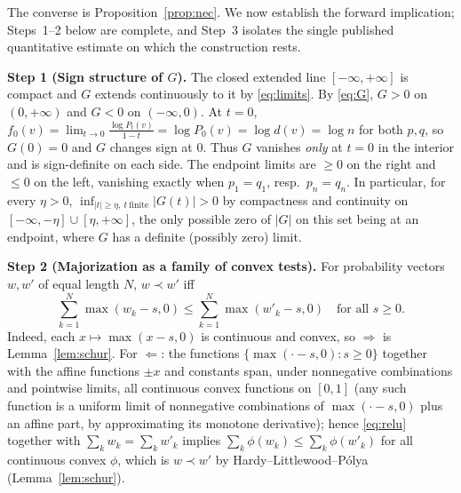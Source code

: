 \documentclass{amsart}
\theoremstyle{plain}
\theoremstyle{definition}
\newcommand{\maj}{\prec}
\begin{document}
The converse is Proposition~\ref{prop:nec}. We now establish the forward implication;
Steps~1--2 below are complete, and Step~3 isolates the single published quantitative
estimate on which the construction rests.

\smallskip
\noindent\textbf{Step 1 (Sign structure of $G$).}
The closed extended line $[-\infty,+\infty]$ is compact and $G$ extends continuously to
it by \eqref{eq:limits}. By \eqref{eq:G}, $G>0$ on $(0,+\infty)$ and $G<0$ on
$(-\infty,0)$. At $t=0$, $f_0(v)=\lim_{t\to0}\frac{\log P_t(v)}{1-t}=\log P_0(v)=\log
d(v)=\log n$ for both $p,q$, so $G(0)=0$ and $G$ changes sign at $0$. Thus $G$ vanishes
\emph{only} at $t=0$ in the interior and is sign-definite on each side. The endpoint
limits are $\ge0$ on the right and $\le0$ on the left, vanishing exactly when $p_1=q_1$,
resp.\ $p_n=q_n$. In particular, for every $\eta>0$,
$\inf_{|t|\ge\eta,\ t\ \text{finite}}|G(t)|>0$ by compactness and continuity on
$[-\infty,-\eta]\cup[\eta,+\infty]$, the only possible zero of $|G|$ on this set being
at an endpoint, where $G$ has a definite (possibly zero) limit.

\smallskip
\noindent\textbf{Step 2 (Majorization as a family of convex tests).}
For probability vectors $w,w'$ of equal length $N$, $w\maj w'$ iff
\begin{equation}\label{eq:relu}
   \sum_{k=1}^N\max(w_k-s,0)\le\sum_{k=1}^N\max(w'_k-s,0)\quad\text{for all }s\ge0.
\end{equation}
Indeed, each $x\mapsto\max(x-s,0)$ is continuous and convex, so $\Rightarrow$ is
Lemma~\ref{lem:schur}. For $\Leftarrow$: the functions $\{\max(\cdot-s,0):s\ge0\}$
together with the affine functions $\pm x$ and constants span, under nonnegative
combinations and pointwise limits, all continuous convex functions on $[0,1]$ (any such
function is a uniform limit of nonnegative combinations of $\max(\cdot-s,0)$ plus an
affine part, by approximating its monotone derivative); hence \eqref{eq:relu} together
with $\sum_k w_k=\sum_k w'_k$ implies $\sum_k\phi(w_k)\le\sum_k\phi(w'_k)$ for all
continuous convex $\phi$, which is $w\maj w'$ by Hardy--Littlewood--P\'olya
(Lemma~\ref{lem:schur}).
\end{document}
